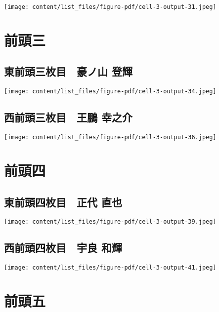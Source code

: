 \documentclass[
  letterpaper,
]{bxjsbook}
\begin{document}
\texttt{[image: content/list\_files/figure-pdf/cell-3-output-31.jpeg]}

\section{前頭三}\label{ux524dux982dux4e09}

\subsection{東前頭三枚目　豪ノ山
登輝}\label{ux6771ux524dux982dux4e09ux679aux76ee-ux8c6aux30ceux5c71-ux767bux8f1d}

\texttt{[image: content/list\_files/figure-pdf/cell-3-output-34.jpeg]}

\subsection{西前頭三枚目　王鵬
幸之介}\label{ux897fux524dux982dux4e09ux679aux76ee-ux738bux9d6c-ux5e78ux4e4bux4ecb}

\texttt{[image: content/list\_files/figure-pdf/cell-3-output-36.jpeg]}

\section{前頭四}\label{ux524dux982dux56db}

\subsection{東前頭四枚目　正代
直也}\label{ux6771ux524dux982dux56dbux679aux76ee-ux6b63ux4ee3-ux76f4ux4e5f}

\texttt{[image: content/list\_files/figure-pdf/cell-3-output-39.jpeg]}

\subsection{西前頭四枚目　宇良
和輝}\label{ux897fux524dux982dux56dbux679aux76ee-ux5b87ux826f-ux548cux8f1d}

\texttt{[image: content/list\_files/figure-pdf/cell-3-output-41.jpeg]}

\section{前頭五}\label{ux524dux982dux4e94}
\end{document}
